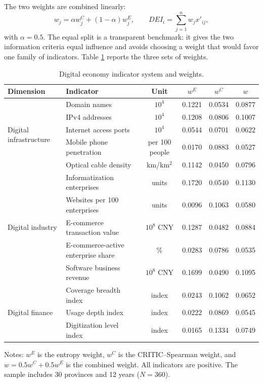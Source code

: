 \documentclass[economies,article,submit,moreauthors]{Definitions/mdpi}
\begin{document}
The two weights are combined linearly:
\begin{equation}
w_j=\alpha w_j^{C}+(1-\alpha)w_j^{E},
\qquad
DEI_i=\sum_{j=1}^{n}w_jx'_{ij},
\label{eq:combined}
\end{equation}
with $\alpha=0.5$. The equal split is a transparent benchmark: it gives the two information criteria equal influence and avoids choosing a weight that would favor one family of indicators. Table \ref{tab:dei} reports the three sets of weights.

\begin{table}[!htbp]
\centering
\caption{Digital economy indicator system and weights.}
\label{tab:dei}
\footnotesize
\setlength{\tabcolsep}{4pt}
\begin{threeparttable}
\begin{tabular}{llcccc}
\toprule
Dimension & Indicator & Unit & $w^{E}$ & $w^{C}$ & $w$\\
\midrule
\multirow{5}{*}{Digital infrastructure}
 & Domain names & $10^4$ & 0.1221 & 0.0534 & 0.0877\\
 & IPv4 addresses & $10^4$ & 0.1208 & 0.0806 & 0.1007\\
 & Internet access ports & $10^4$ & 0.0544 & 0.0701 & 0.0622\\
 & Mobile phone penetration & per 100 people & 0.0170 & 0.0883 & 0.0527\\
 & Optical cable density & km/km$^2$ & 0.1142 & 0.0450 & 0.0796\\
\midrule
\multirow{5}{*}{Digital industry}
 & Informatization enterprises & units & 0.1720 & 0.0540 & 0.1130\\
 & Websites per 100 enterprises & units & 0.0096 & 0.1063 & 0.0580\\
 & E-commerce transaction value & $10^8$ CNY & 0.1287 & 0.0482 & 0.0884\\
 & E-commerce-active enterprise share & \% & 0.0283 & 0.0786 & 0.0535\\
 & Software business revenue & $10^8$ CNY & 0.1699 & 0.0490 & 0.1095\\
\midrule
\multirow{3}{*}{Digital finance}
 & Coverage breadth index & index & 0.0243 & 0.1062 & 0.0652\\
 & Usage depth index & index & 0.0222 & 0.0869 & 0.0545\\
 & Digitization level index & index & 0.0165 & 0.1334 & 0.0749\\
\bottomrule
\end{tabular}
\begin{tablenotes}\footnotesize
\item Notes: $w^{E}$ is the entropy weight, $w^{C}$ is the CRITIC--Spearman weight, and $w=0.5w^{C}+0.5w^{E}$ is the combined weight. All indicators are positive. The sample includes 30 provinces and 12 years ($N=360$).
\end{tablenotes}
\end{threeparttable}
\end{table}
\end{document}

